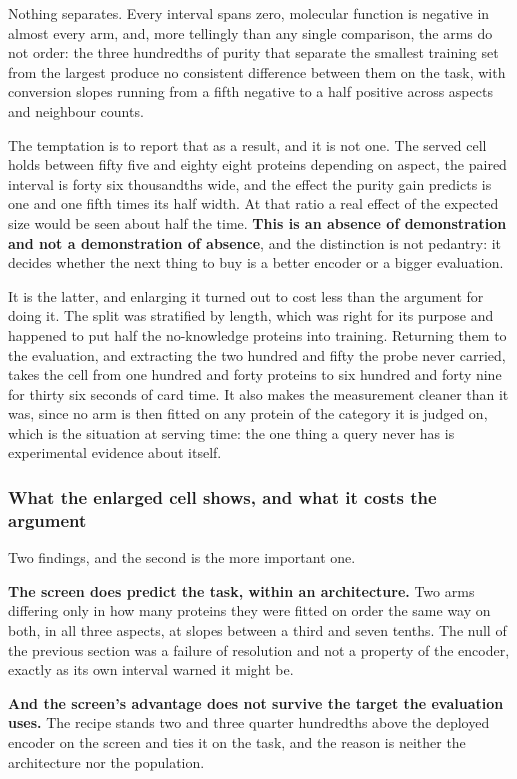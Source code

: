 Nothing separates. Every interval spans zero, molecular function is negative in almost
every arm, and, more tellingly than any single comparison, the arms do not order: the
three hundredths of purity that separate the smallest training set from the largest
produce no consistent difference between them on the task, with conversion slopes running
from a fifth negative to a half positive across aspects and neighbour counts.

The temptation is to report that as a result, and it is not one. The served cell holds
between fifty five and eighty eight proteins depending on aspect, the paired interval is
forty six thousandths wide, and the effect the purity gain predicts is one and one fifth
times its half width. At that ratio a real effect of the expected size would be seen
about half the time. \textbf{This is an absence of demonstration and not a demonstration of
absence}, and the distinction is not pedantry: it decides whether the next thing to buy
is a better encoder or a bigger evaluation.

It is the latter, and enlarging it turned out to cost less than the argument for doing
it. The split was stratified by length, which was right for its purpose and happened to
put half the no-knowledge proteins into training. Returning them to the evaluation, and
extracting the two hundred and fifty the probe never carried, takes the cell from one
hundred and forty proteins to six hundred and forty nine for thirty six seconds of card
time. It also makes the measurement cleaner than it was, since no arm is then fitted on
any protein of the category it is judged on, which is the situation at serving time: the
one thing a query never has is experimental evidence about itself.

\subsubsection{What the enlarged cell shows, and what it costs the argument}

Two findings, and the second is the more important one.

\textbf{The screen does predict the task, within an architecture.} Two arms differing
only in how many proteins they were fitted on order the same way on both, in all three
aspects, at slopes between a third and seven tenths. The null of the previous section was
a failure of resolution and not a property of the encoder, exactly as its own interval
warned it might be.

\textbf{And the screen's advantage does not survive the target the evaluation uses.} The
recipe stands two and three quarter hundredths above the deployed encoder on the screen
and ties it on the task, and the reason is neither the architecture nor the population.

